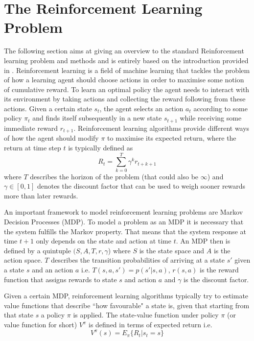\documentclass[../main.tex]{subfiles}
\begin{document}
\section{The Reinforcement Learning Problem}\label{sec:RL}
The following section aims at giving an overview to the standard Reinforcement learning problem and methods and is entirely based on the introduction provided in \cite{sutton1998reinforcement}.
Reinforcement learning is a field of machine learning that tackles the problem of how a learning agent should choose actions in order to maximise some notion of cumulative reward. To learn an optimal policy the agent needs to interact with its environment by taking actions and collecting the reward following from these actions. Given a certain state $s_t$, the agent selects an action $a_t$ according to some policy $\pi_t$ and finds itself subsequently in a new state $s_{t+1}$ while receiving some immediate reward $r_{t+1}$. Reinforcement learning algorithms provide different ways of how the agent should modify $\pi$ to maximise its expected return, where the return at time step $t$ is typically defined as
\begin{equation}
R_t = \sum_{k=0}^T \gamma^kr_{t+k+1}
\end{equation}
where $T$ describes the horizon of the problem (that could also be $\infty$) and $\gamma \in [0,1]$ denotes the discount factor that can be used to weigh sooner rewards more than later rewards.\par
An important framework to model reinforcement learning problems are Markov Decision Processes (MDP). To model a problem as an MDP it is necessary that the system fulfills the Markov property. That means that the system response at time $t+1$ only depends on the state and action at time $t$. An MDP then is defined by a quintuple $(S,A,T,r,\gamma$) where $S$ is the state space and $A$ is the action space. $T$ describes the transition probabilities of arriving at a state $s'$ given a state $s$ and an action $a$ i.e. $T(s,a,s') = p(s'|s,a)$, $r(s,a)$ is the reward function that assigns rewards to state $s$ and action $a$ and $\gamma$ is the discount factor. \par
Given a certain MDP, reinforcement learning algorithms typically try to estimate value functions that describe ``how favourable" a state is, given that starting from that state $s$ a policy $\pi$ is applied. The state-value function under policy $\pi$ (or value function for short) $V^\pi$ is defined in terms of expected return i.e.
\begin{equation}
V^\pi(s) = E_\pi\{R_t|s_t = s\}
\end{equation}
\end{document}
